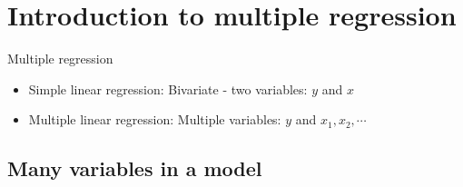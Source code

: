 \section{Introduction to multiple regression}


\begin{frame}{Multiple regression}

\begin{itemize}

\item Simple linear regression: Bivariate - two variables: $y$ and $x$

\item Multiple linear regression: Multiple variables: $y$ and $x_1, x_2, \cdots$

\end{itemize}

\end{frame}


\subsection{Many variables in a model}



